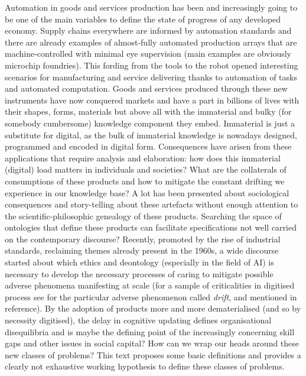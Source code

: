 \documentclass[14pt]{extarticle}
\begin{document}
\hspace*{15mm}Automation in goods and services production has been and increasingly going to be one of the main variables to define the state of progress of any developed economy. Supply chains everywhere are informed by automation standards and there are already examples of almost-fully automated production arrays that are machine-controlled with minimal eye supervision (main examples are obviously microchip foundries). This fording from the tools to the robot opened interesting scenarios for manufacturing and service delivering thanks to automation of tasks and automated computation.
\newline
\hspace*{15mm}Goods and services produced through these new instruments have now conquered markets and have a part in billions of lives with their shapes, forms, materials but above all with the immaterial and bulky (for somebody cumbersome) knowledge component they embed. Immaterial is just a substitute for digital, as the bulk of immaterial knowledge is nowadays designed, programmed and encoded in digital form. Consequences have arisen from these applications that require analysis and elaboration: how does this immaterial (digital) load matters in individuals and societies? What are the collaterals of consumptions of these products and how to mitigate the constant drifting we experience in our knowledge base? A lot has been presented about sociological consequences and story-telling about these artefacts \cite{UMPLEBYcybUSA} without enough attention to the scientific-philosophic genealogy of these products. Searching the space of ontologies that define these products can facilitate specifications not well carried on the contemporary discourse?
\newline
\hspace*{15mm}Recently, promoted by the rise of industrial standards, reclaiming themes already present in the 1960s, a wide discourse started about which ethics and deontology (especially in the field of AI) is necessary to develop the necessary processes of caring to mitigate possible adverse phenomena manifesting at scale (for a sample of criticalities in digitised process see \cite{Pentland2020} for the particular adverse phenomenon called \textit{drift}, and mentioned in reference). By the adoption of products more and more dematerialised (and so by necessity digitised), the delay in cognitive updating defines organisational disequilibria and is maybe the defining point of the increasingly concerning skill gaps and other issues in social capital? How can we wrap our heads around these new classes of problems? This text proposes some basic definitions and provides a clearly not exhaustive working hypothesis to define these classes of problems. 
\end{document}
